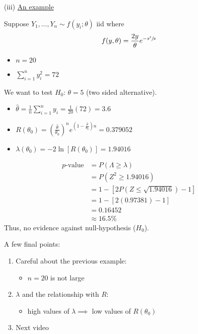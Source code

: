 (iii) \underline{An example}
\begin{exbox}
    \begin{example}
        Suppose $ Y_1,\ldots ,Y_n \sim f(y_i;\theta) $ iid where
        \[ f(y,\theta)=\frac{2y}{\theta}e^{-\sfrac{y^2}{\theta}} \]
        \begin{itemize}
            \item $ n=20 $
            \item $ \sum\limits_{i=1}^{n} y_i^2=72 $
        \end{itemize}

        We want to test $ H_0 $: $ \theta=5 $ (two sided alternative).
        \begin{itemize}
            \item $ \hat{\theta}=\frac{1}{n} \sum\limits_{i=1}^{n}y_i=\frac{1}{20}(72)=3.6 $
            \item $ R(\theta_0)=\left( \frac{\hat{\theta}}{\theta_0} \right)^n
                      e^{\left(1-\frac{\hat{\theta}}{\theta_0}\right)n} = 0.379052 $
            \item $ \lambda(\theta_0) =-2\ln \left[ R(\theta_0) \right]=1.94016 $
        \end{itemize}
        \begin{align*}
            p\text{-value}
             & =P(\Lambda\geqslant \lambda)                       \\
             & =P(Z^2\geqslant 1.94016)                           \\
             & =1-\left[ 2 P(Z\leqslant \sqrt{1.94016})-1 \right] \\
             & = 1-\left[ 2(0.97381)-1 \right]                    \\
             & = 0.16452                                          \\
             & \approx 16.5\%
        \end{align*}
        Thus, no evidence against null-hypothesis ($ H_0 $).
    \end{example}
\end{exbox}
A few final points:
\begin{enumerate}[label=(\roman*)]
    \item Careful about the previous example:
          \begin{itemize}
              \item $ n=20 $ is not large
          \end{itemize}
    \item $ \lambda $ and the relationship with $ R $:
          \begin{itemize}
              \item high values of $ \lambda\implies $ low values of $ R(\theta_0) $
          \end{itemize}
    \item Next video
\end{enumerate}

